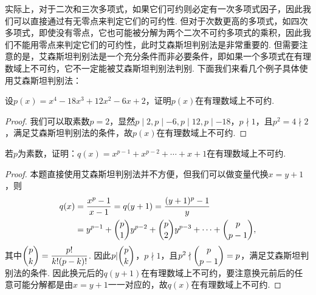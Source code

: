 实际上，对于二次和三次多项式，如果它们可约则必定有一次多项式因子，因此我们可以直接通过有无零点来判定它们的可约性. 但对于次数更高的多项式，如四次多项式，即使没有零点，它也可能被分解为两个二次不可约多项式的乘积，因此我们不能用零点来判定它们的可约性，此时艾森斯坦判别法是非常重要的. 但需要注意的是，艾森斯坦判别法是一个充分条件而非必要条件，即如果一个多项式在有理数域上不可约，它不一定能被艾森斯坦判别法判别. 下面我们来看几个例子具体使用艾森斯坦判别法：
\begin{example}{}{}
    设$p(x)=x^4-18x^3+12x^2-6x+2$，证明$p(x)$在有理数域上不可约.
\end{example}
\begin{proof}
    我们可以取素数$p=2$，显然$p\mid 2,p\mid -6,p\mid 12,p\mid -18$，$p\nmid 1$，且$p^2=4\nmid 2$，满足艾森斯坦判别法的条件，故$p(x)$在有理数域上不可约.
\end{proof}

\begin{example}{}{}
    若$p$为素数，证明：$q(x)=x^{p-1}+x^{p-2}+\cdots+x+1$在有理数域上不可约.
\end{example}
\begin{proof}
    本题直接使用艾森斯坦判别法并不方便，但我们可以做变量代换$x=y+1$，则
    \begin{align*}
        q(x) & =\dfrac{x^p-1}{x-1}=q(y+1)=\dfrac{(y+1)^p-1}{y}                               \\
             & =y^{p-1}+\dbinom{p}{1}y^{p-2}+\dbinom{p}{2}y^{p-3}+\cdots+\dbinom{p}{p-1},
    \end{align*}
    其中$\dbinom{p}{k}=\dfrac{p!}{k!(p-k)!}$. 因此$p|\dbinom{p}{k}$，$p\nmid 1$，且$p^2\nmid \dbinom{p}{p-1}=p$，满足艾森斯坦判别法的条件. 因此换元后的$q(y+1)$在有理数域上不可约，要注意换元前后的任意可能分解都是由$x=y+1$一一对应的，故$q(x)$在有理数域上不可约.
\end{proof}

